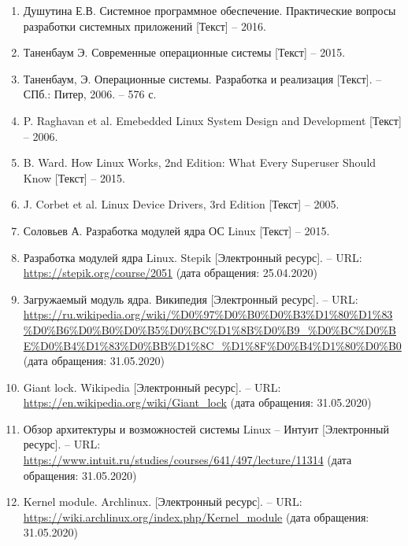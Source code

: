 \begin{enumerate}
	\item Душутина Е.В. Системное программное обеспечение. Практические вопросы разработки системных приложений [Текст] -- 2016.
	\item Таненбаум Э. Современные операционные системы [Текст] -- 2015.
	\item Таненбаум, Э. Операционные системы. Разработка и реализация [Текст]. -- СПб.: Питер, 2006. -- 576 с.
	\item P. Raghavan et al. Emebedded Linux System Design and Development [Текст] -- 2006.
	\item B. Ward. How Linux Works, 2nd Edition: What Every Superuser Should Know [Текст] -- 2015.
	\item J. Corbet et al. Linux Device Drivers, 3rd Edition [Текст] -- 2005.
	\item Соловьев А. Разработка модулей ядра ОС Linux [Текст] -- 2015.
	\item Разработка модулей ядра Linux. Stepik [Электронный ресурс]. -- URL: \url{https://stepik.org/course/2051} (дата обращения: 25.04.2020)
	\item Загружаемый модуль ядра. Википедия [Электронный ресурс]. -- URL: \url{https://ru.wikipedia.org/wiki/%D0%97%D0%B0%D0%B3%D1%80%D1%83%D0%B6%D0%B0%D0%B5%D0%BC%D1%8B%D0%B9_%D0%BC%D0%BE%D0%B4%D1%83%D0%BB%D1%8C_%D1%8F%D0%B4%D1%80%D0%B0} (дата обращения: 31.05.2020)
	\item Giant lock. Wikipedia [Электронный ресурс]. -- URL: \url{https://en.wikipedia.org/wiki/Giant_lock} (дата обращения: 31.05.2020)
	\item Обзор архитектуры и возможностей системы Linux -- Интуит [Электронный ресурс]. -- URL: \url{https://www.intuit.ru/studies/courses/641/497/lecture/11314} (дата обращения: 31.05.2020)
	\item Kernel module. Archlinux. [Электронный ресурс]. -- URL: \url{https://wiki.archlinux.org/index.php/Kernel_module} (дата обращения: 31.05.2020)
\end{enumerate}


